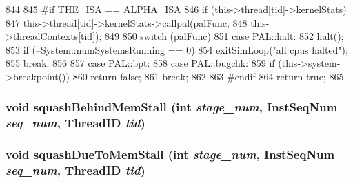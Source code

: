 \begin{DoxyCode}
844 {
845 #if THE_ISA == ALPHA_ISA
846     if (this->thread[tid]->kernelStats)
847         this->thread[tid]->kernelStats->callpal(palFunc,
848                                                 this->threadContexts[tid]);
849 
850     switch (palFunc) {
851       case PAL::halt:
852         halt();
853         if (--System::numSystemsRunning == 0)
854             exitSimLoop("all cpus halted");
855         break;
856 
857       case PAL::bpt:
858       case PAL::bugchk:
859         if (this->system->breakpoint())
860             return false;
861         break;
862     }
863 #endif
864     return true;
865 }
\end{DoxyCode}
\hypertarget{classInOrderCPU_a7c7508de9bcbfd4fa1fafd285a8f3930}{
\subsubsection[{squashBehindMemStall}]{\setlength{\rightskip}{0pt plus 5cm}void squashBehindMemStall (int {\em stage\_\-num}, \/  {\bf InstSeqNum} {\em seq\_\-num}, \/  {\bf ThreadID} {\em tid})}}
\label{classInOrderCPU_a7c7508de9bcbfd4fa1fafd285a8f3930}
\hypertarget{classInOrderCPU_a302751e3ba3d567b01c7446f9227a2da}{
\subsubsection[{squashDueToMemStall}]{\setlength{\rightskip}{0pt plus 5cm}void squashDueToMemStall (int {\em stage\_\-num}, \/  {\bf InstSeqNum} {\em seq\_\-num}, \/  {\bf ThreadID} {\em tid})}}
\label{classInOrderCPU_a302751e3ba3d567b01c7446f9227a2da}




